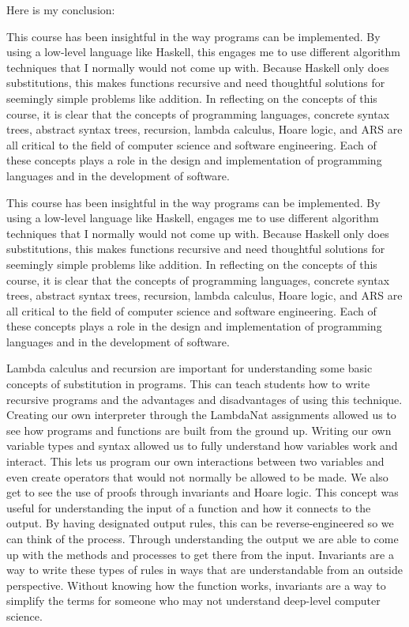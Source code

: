 \documentclass{article}
\theoremstyle{theorem}
\theoremstyle{definition}
\theoremstyle{remark}
\begin{document}
Here is my conclusion:

\medskip

This course has been insightful in the way programs can be implemented. By using a low-level language like Haskell, this engages me to use different algorithm techniques that I normally would not come up with. Because Haskell only does substitutions, this makes functions recursive and need thoughtful solutions for seemingly simple problems like addition. In reflecting on the concepts of this course, it is clear that the concepts of programming languages, concrete syntax trees, abstract syntax trees, recursion, lambda calculus, Hoare logic, and ARS are all critical to the field of computer science and software engineering. Each of these concepts plays a role in the design and implementation of programming languages and in the development of software.

\medskip
This course has been insightful in the way programs can be implemented. By using a low-level language like Haskell, engages me to use different algorithm techniques that I normally would not come up with. Because Haskell only does substitutions, this makes functions recursive and need thoughtful solutions for seemingly simple problems like addition. In reflecting on the concepts of this course, it is clear that the concepts of programming languages, concrete syntax trees, abstract syntax trees, recursion, lambda calculus, Hoare logic, and ARS are all critical to the field of computer science and software engineering. Each of these concepts plays a role in the design and implementation of programming languages and in the development of software.

\medskip
Lambda calculus and recursion are important for understanding some basic concepts of substitution in programs. This can teach students how to write recursive programs and the advantages and disadvantages of using this technique. Creating our own interpreter through the LambdaNat assignments allowed us to see how programs and functions are built from the ground up. Writing our own variable types and syntax allowed us to fully understand how variables work and interact. This lets us program our own interactions between two variables and even create operators that would not normally be allowed to be made. We also get to see the use of proofs through invariants and Hoare logic. This concept was useful for understanding the input of a function and how it connects to the output. By having designated output rules, this can be reverse-engineered so we can think of the process. Through understanding the output we are able to come up with the methods and processes to get there from the input. Invariants are a way to write these types of rules in ways that are understandable from an outside perspective. Without knowing how the function works, invariants are a way to simplify the terms for someone who may not understand deep-level computer science.
\end{document}
